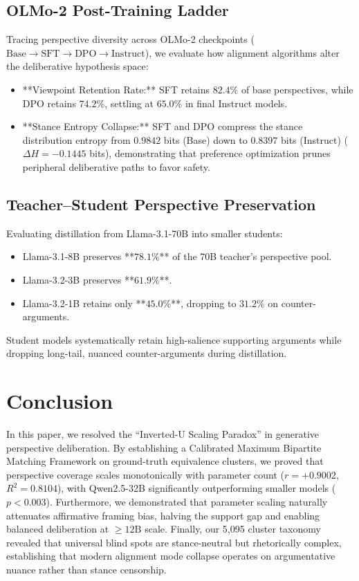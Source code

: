 \documentclass[11pt,a4paper]{article}
\begin{document}
\subsection{OLMo-2 Post-Training Ladder}
Tracing perspective diversity across OLMo-2 checkpoints ($\text{Base} \to \text{SFT} \to \text{DPO} \to \text{Instruct}$), we evaluate how alignment algorithms alter the deliberative hypothesis space:
\begin{itemize}
    \item **Viewpoint Retention Rate:** SFT retains $82.4\%$ of base perspectives, while DPO retains $74.2\%$, settling at $65.0\%$ in final Instruct models.
    \item **Stance Entropy Collapse:** SFT and DPO compress the stance distribution entropy from $0.9842$ bits (Base) down to $0.8397$ bits (Instruct) ($\Delta H = -0.1445$ bits), demonstrating that preference optimization prunes peripheral deliberative paths to favor safety.
\end{itemize}

\subsection{Teacher--Student Perspective Preservation}
Evaluating distillation from Llama-3.1-70B into smaller students:
\begin{itemize}
    \item Llama-3.1-8B preserves **$78.1\%$** of the 70B teacher's perspective pool.
    \item Llama-3.2-3B preserves **$61.9\%$**.
    \item Llama-3.2-1B retains only **$45.0\%$**, dropping to $31.2\%$ on counter-arguments.
\end{itemize}
Student models systematically retain high-salience supporting arguments while dropping long-tail, nuanced counter-arguments during distillation.

\section{Conclusion}

In this paper, we resolved the ``Inverted-U Scaling Paradox'' in generative perspective deliberation. By establishing a Calibrated Maximum Bipartite Matching Framework on ground-truth equivalence clusters, we proved that perspective coverage scales monotonically with parameter count ($r = +0.9002$, $R^2 = 0.8104$), with Qwen2.5-32B significantly outperforming smaller models ($p < 0.003$). Furthermore, we demonstrated that parameter scaling naturally attenuates affirmative framing bias, halving the support gap and enabling balanced deliberation at $\ge 12\text{B}$ scale. Finally, our 5,095 cluster taxonomy revealed that universal blind spots are stance-neutral but rhetorically complex, establishing that modern alignment mode collapse operates on argumentative nuance rather than stance censorship.
\end{document}
